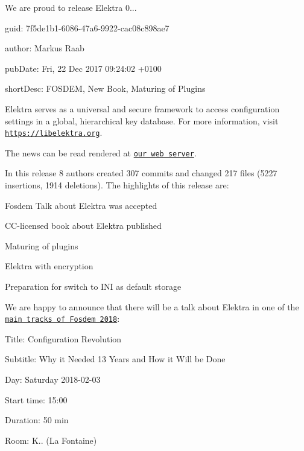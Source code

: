 We are proud to release Elektra 0...


\begin{DoxyItemize}
\item guid\+: 7f5de1b1-\/6086-\/47a6-\/9922-\/cac08c898ae7
\item author\+: Markus Raab
\item pub\+Date\+: Fri, 22 Dec 2017 09\+:24\+:02 +0100
\item short\+Desc\+: F\+O\+S\+D\+EM, New Book, Maturing of Plugins
\end{DoxyItemize}

Elektra serves as a universal and secure framework to access configuration settings in a global, hierarchical key database. For more information, visit \href{https://libelektra.org}{\tt https\+://libelektra.\+org}.

The news can be read rendered at \href{https://www.libelektra.org/news/0.8.21-release}{\tt our web server}.

In this release 8 authors created 307 commits and changed 217 files (5227 insertions, 1914 deletions). The highlights of this release are\+:


\begin{DoxyItemize}
\item Fosdem Talk about Elektra was accepted
\item C\+C-\/licensed book about Elektra published
\item Maturing of plugins
\item Elektra with encryption
\item Preparation for switch to I\+NI as default storage
\end{DoxyItemize}

We are happy to announce that there will be a talk about Elektra in one of the \href{https://fosdem.org/2018/schedule/event/elektra/}{\tt main tracks of Fosdem 2018}\+:


\begin{DoxyItemize}
\item Title\+: Configuration Revolution
\item Subtitle\+: Why it Needed 13 Years and How it Will be Done
\item Day\+: Saturday 2018-\/02-\/03
\item Start time\+: 15\+:00
\item Duration\+: 50 min
\item Room\+: K.. (La Fontaine)
\end{DoxyItemize}


